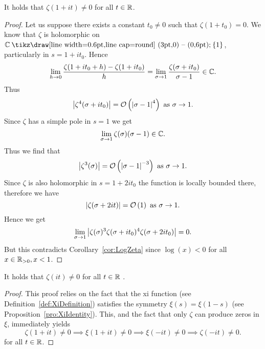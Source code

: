 \begin{theorem}
	It holds that $\zeta(1 + it) \neq 0$ for all $t \in \mathbb{R}$.
\end{theorem}
\begin{proof}
	Let us suppose there exists a constant $t_0 \neq 0$ such that $\zeta(1 + t_0) = 0$. We know that $\zeta$ is holomorphic on $\field{C} \mysetminus \{1\}$, particularly in $s = 1 + it_0$. Hence
\begin{equation*}
	\lim\limits_{h \to 0} \frac{\zeta(1 + it_0 + h) - \zeta(1 + it_0)}{h} = \lim\limits_{\sigma \to 1} \frac{\zeta(\sigma + it_0)}{\sigma - 1} \in \mathbb{C}.
\end{equation*}
	Thus
\begin{equation*}
	\left|\zeta^4(\sigma + it_0)\right| = \mathcal{O}\left(\left|\sigma - 1\right|^4\right) \text{ as } \sigma \to 1.
\end{equation*}
	Since $\zeta$ has a simple pole in $s = 1$ we get
\begin{equation*}
	\lim\limits_{\sigma \to 1}\zeta(\sigma) (\sigma - 1) \in \mathbb{C}.
\end{equation*}
	Thus we find that
\begin{equation*}
	 \left|\zeta^3(\sigma)\right| = \mathcal{O}\left(\left|\sigma - 1\right|^{-3}\right) \text{ as } \sigma \to 1.
\end{equation*}
	Since $\zeta$ is also holomorphic in $s = 1 + 2it_0$ the function is locally bounded there, therefore we have
\begin{equation*}
	 \left|\zeta(\sigma + 2it)\right| = \mathcal{O}\left(1\right) \text{ as } \sigma \to 1.
\end{equation*}
	Hence we get
\begin{equation*}
	 \lim\limits_{\sigma \to 1} \left|\zeta(\sigma)^3 \zeta(\sigma + it_0)^4 \zeta(\sigma + 2it_0)\right| = 0.
\end{equation*}
	But this contradicts Corollary~\ref{cor:LogZeta} since $\log(x) < 0$ for all $x \in \mathbb{R}_{>0}, x < 1$.
\end{proof}


\begin{corollary}
	It holds that $\zeta(it) \neq 0$ for all $t \in \mathbb{R}$ .
\end{corollary}
\begin{proof}
	This proof relies on the fact that the xi function (see Definition~\ref{def:XiDefinition}) satisfies the symmetry $\xi(s) = \xi(1 - s)$ (see Proposition~\ref{pro:XiIdentity}). This, and the fact that only $\zeta$ can produce zeros in $\xi$, immediately yields
\begin{equation*}
	\zeta(1 + it) \neq 0 \implies \xi(1 + it) \neq 0 \implies \xi(-it) \neq 0 \implies \zeta(-it) \neq 0.	
\end{equation*}
	for all $t \in \mathbb{R}$.
\end{proof}


